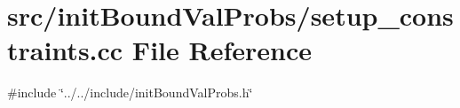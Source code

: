 \section{src/init\+Bound\+Val\+Probs/setup\+\_\+constraints.cc File Reference}
\label{setup__constraints_8cc}
{\ttfamily \#include \char`\"{}../../include/init\+Bound\+Val\+Probs.\+h\char`\"{}}\newline
